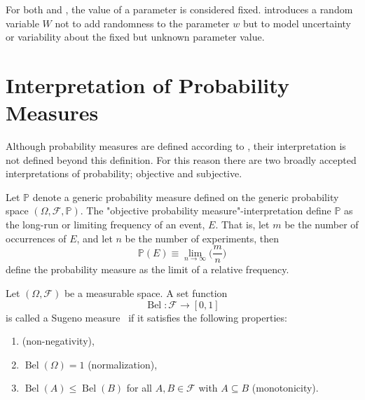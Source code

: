 \begin{remark}
	For both  and , the value of a parameter is considered fixed.  introduces a random variable $W$ not to add randomness to the parameter $w$ but to model uncertainty or variability about the fixed but unknown parameter value.
\end{remark}

\newpage
\section{Interpretation of Probability Measures} 
Although probability measures are defined according to , their interpretation is not defined beyond this definition. For this reason there are two broadly accepted interpretations of probability; objective and subjective. 

\begin{definition}
	\label{def:objective_probability}
	Let $\mathbb{P}$ denote a generic probability measure defined on the generic probability space $(\Omega,\mathcal{F},\mathbb{P})$. The "objective probability measure"-interpretation define $\mathbb{P}$ as the long-run or limiting frequency of an event, $E$. That is, let $m$ be the number of occurrences of $E$, and let $n$ be the number of experiments, then~\cite{Leamer1978}
	\begin{equation}
		\mathbb{P}(E) \equiv \lim_{{n \to \infty}} \bigg(\frac{m}{n}\bigg)
	\end{equation}
	define the probability measure as the limit of a relative frequency.
\end{definition}

\begin{definition}
	\label{def:sugeno_measure}
	Let $(\Omega, \mathcal{F})$ be a measurable space. A set function
	\begin{equation}
		\operatorname{Bel}: \mathcal{F} \to [0,1]
	\end{equation}
	is called a Sugeno measure~\cite{shafer1987} if it satisfies the following properties:
	\begin{enumerate}
		\item {} (non-negativity),
		\item $\operatorname{Bel}(\Omega) = 1$ (normalization),
		\item $\operatorname{Bel}(A) \le \operatorname{Bel}(B)$ for all $A, B \in \mathcal{F}$ with $A \subseteq B$ (monotonicity).
	\end{enumerate}
\end{definition}

